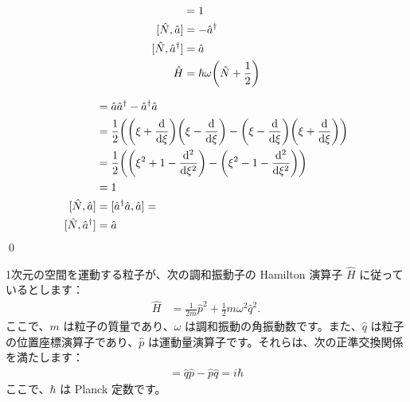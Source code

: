 \documentclass[uplatex,dvipdfmx,a4paper,11pt]{jlreq}
\makeatletter
\numberwithin{equation}{section}
\theoremstyle{definition}
\renewenvironment{proof}[1][\proofname]{\par
  \normalfont
  \topsep6\p@\@plus6\p@ \trivlist
  \item[\hskip\labelsep{\bfseries #1}\@addpunct{\bfseries}]\ignorespaces\quad\par
}{%
  \qed\endtrivlist\@endpefalse
}
\renewcommand\proofname{証明}
\makeatother
\begin{document}
\begin{proposition}
  \begin{align}
    [\hat{a}, \hat{a}^\dagger] & = 1                                      \\
    [\hat{N}, \hat{a}]         & = -\hat{a}^\dagger                       \\
    [\hat{N}, \hat{a}^\dagger] & = \hat{a}                                \\
    \hat{H}                    & = \hbar\omega\qty(\hat{N} + \frac{1}{2})
  \end{align}
\end{proposition}
\begin{proof}
  \begin{align}
    [\hat{a}, \hat{a}^\dagger] & = \hat{a}\hat{a}^\dagger - \hat{a}^\dagger\hat{a}                                                      \\
                               & = \frac{1}{2}\qty(\qty(\xi + \dv{\xi})\qty(\xi - \dv{\xi}) - \qty(\xi - \dv{\xi})\qty(\xi + \dv{\xi})) \\
                               & = \frac{1}{2}\qty(\qty(\xi^2 + 1 - \dv[2]{\xi}) - \qty(\xi^2 - 1 - \dv[2]{\xi}))                       \\
                               & = 1                                                                                                    \\
    [\hat{N}, \hat{a}]         & = [\hat{a}^\dagger\hat{a}, \hat{a}] =                                                                  \\
    [\hat{N}, \hat{a}^\dagger] & = \hat{a}                                                                                              \\
  \end{align}
\end{proof}

1次元の空間を運動する粒子が、次の調和振動子の Hamilton 演算子 $\hat{H}$ に従っているとします：
\begin{align}
  \hat{H} & = \frac{1}{2m}\hat{p}^2 + \frac{1}{2}m\omega^2\hat{q}^2.
\end{align}
ここで、$m$ は粒子の質量であり、$\omega$ は調和振動の角振動数です。また、$\hat{q}$ は粒子の位置座標演算子であり、$\hat{p}$ は運動量演算子です。それらは、次の正準交換関係を満たします：
\begin{align}
  [\hat{q}, \hat{p}] = \hat{q}\hat{p} - \hat{p}\hat{q} = i\hbar
\end{align}
ここで、$\hbar$ は Planck 定数です。
\end{document}
